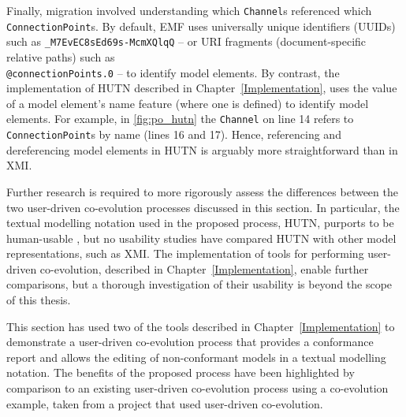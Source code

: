 Finally, migration involved understanding which \texttt{Ch\-an\-n\-el}s referenced which \texttt{Co\-nn\-ec\-ti\-onPo\-in\-t}s.  By default, EMF uses universally unique identifiers (UUIDs) such as \texttt{\_M7EvEC8sEd69s-McmXQlqQ} -- or URI fragments (document-specific relative paths) such as \texttt{\\@co\-nn\-ec\-ti\-onPo\-in\-ts.0} -- to identify model elements. By contrast, the implementation of HUTN described in Chapter~\ref{Implementation}, uses the value of a model element's name feature (where one is defined) to identify model elements. For example, in \ref{fig:po_hutn} the \texttt{Ch\-an\-n\-el} on line 14 refers to \texttt{Co\-nn\-ec\-ti\-onPo\-in\-t}s by name (lines 16 and 17). Hence, referencing and dereferencing model elements in HUTN is arguably more straightforward than in XMI.

Further research is required to more rigorously assess the differences between the two user-driven co-evolution processes discussed in this section. In particular, the textual modelling notation used in the proposed process, HUTN, purports to be human-usable \cite{hutn}, but no usability studies have compared HUTN with other model representations, such as XMI. The implementation of tools for performing user-driven co-evolution, described in Chapter~\ref{Implementation}, enable further comparisons, but a thorough investigation of their usability is beyond the scope of this thesis.

This section has used two of the tools described in Chapter~\ref{Implementation} to demonstrate a user-driven co-evolution process that provides a conformance report and allows the editing of non-conformant models in a textual modelling notation. The benefits of the proposed process have been highlighted by comparison to an existing user-driven co-evolution process using a co-evolution example, taken from a project that used user-driven co-evolution.